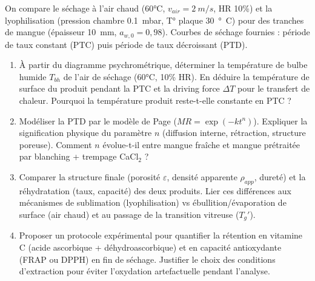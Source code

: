 \documentclass[11pt]{article}
\begin{document}
\begin{exercice}
On compare le séchage à l'air chaud (60°C, $v_{air}=\SI{2}{m/s}$, HR 10\%) et la lyophilisation (pression chambre \SI{0,1}{mbar}, T° plaque \SI{30}{°C}) pour des tranches de mangue (épaisseur \SI{10}{mm}, $a_{w,0}=0,98$). Courbes de séchage fournies : période de taux constant (PTC) puis période de taux décroissant (PTD).
\begin{enumerate}
    \item À partir du diagramme psychrométrique, déterminer la température de bulbe humide $T_{bh}$ de l'air de séchage (60°C, 10\% HR). En déduire la température de surface du produit pendant la PTC et la driving force $\Delta T$ pour le transfert de chaleur. Pourquoi la température produit reste-t-elle constante en PTC ?
    \item Modéliser la PTD par le modèle de Page ($MR = \exp(-k t^n)$). Expliquer la signification physique du paramètre $n$ (diffusion interne, rétraction, structure poreuse). Comment $n$ évolue-t-il entre mangue fraîche et mangue prétraitée par blanching + trempage CaCl$_2$ ?
    \item Comparer la structure finale (porosité $\varepsilon$, densité apparente $\rho_{app}$, dureté) et la réhydratation (taux, capacité) des deux produits. Lier ces différences aux mécanismes de sublimation (lyophilisation) vs ébullition/évaporation de surface (air chaud) et au passage de la transition vitreuse ($T_g'$).
    \item Proposer un protocole expérimental pour quantifier la rétention en vitamine C (acide ascorbique + déhydroascorbique) et en capacité antioxydante (FRAP ou DPPH) en fin de séchage. Justifier le choix des conditions d'extraction pour éviter l'oxydation artefactuelle pendant l'analyse.
\end{enumerate}
\end{exercice}
\end{document}

